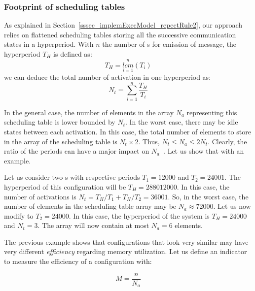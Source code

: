 \documentclass[main.tex]{subfiles}
\begin{document}
\subsubsection{Footprint of scheduling tables}
As explained in Section~\ref{sssec_implemExecModel_repectRule2}, our approach
relies on flattened scheduling tables storing all the successive communication
states in a hyperperiod. With $n$ the number of \PC{}s for emission of message,
the hyperperiod $T_H$ is defined as: 
\begin{displaymath}
    T_H = \underset{i=1}{\overset{n}{lcm}} (T_i)
\end{displaymath}
we can deduce the total number of \PC{} activation in one hyperperiod as:
\begin{displaymath}
    N_t = \underset{i=1}{\overset{n}{\sum}} \dfrac{T_H}{T_i}
\end{displaymath}

In the general case, the number of elements in the array $N_a$ representing
this scheduling table is lower bounded by $N_t$. In the worst case, there may
be idle states between each \PC{} activation. In this case, the total number of
elements to store in the array of the scheduling table is $N_t \times 2$. Thus,
$N_t \leq N_a \leq 2N_t$. Clearly, the ratio of the periods can have a major
impact on $N_a$~\cite{Nasri2016, Mohaqeqi2016}. Let us show that with an
example.

\begin{example}
    Let us consider two \PC{}s with respective periods $T_1 = 12000$ and $T_2 =
    24001$. The hyperperiod of this configuration will be $T_H = 288012000$. In
    this case, the number of \PC{} activations is $N_t = T_H / T_1 + T_H / T_2
    = 36001$. So, in the worst case, the number of elements in the scheduling
    table array may be $N_a\approx 72000$. Let us now modify to $T_2 = 24000$.
    In this case, the hyperperiod of the system is $T_H = 24000$ and $N_t = 3$.
    The array will now contain at most $N_a = 6$ elements.  
\end{example}

The previous example shows that \PC{} configurations that look very similar may
have very different \emph{efficiency} regarding memory utilization. Let us
define an indicator to measure the efficiency of a configuration with:

\begin{displaymath}
    M = \dfrac{n}{N_a}
\end{displaymath}
\end{document}

